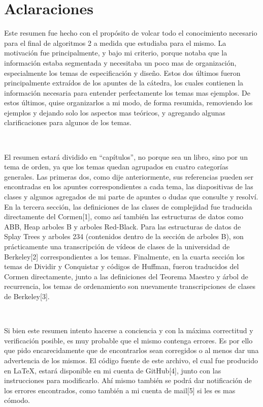 \documentclass[10pt, a4paper]{report}
\begin{document}

\newpage

\chapter*{Aclaraciones}

Este resumen fue hecho con el prop\'osito de volcar todo el conocimiento necesario para el final de algoritmos 2 a medida que estudiaba para el mismo. La motivaci\'on fue principalmente, y bajo mi criterio, porque notaba que la informaci\'on estaba segmentada y necesitaba un poco mas de organizaci\'on, especialmente los temas de especificaci\'on y dise\~no. Estos dos \'ultimos fueron principalmente extra\'idos de los apuntes de la c\'atedra, los cuales contienen la informaci\'on necesaria para entender perfectamente los temas mas ejemplos. De estos \'ultimos, quise organizarlos a mi modo, de forma resumida, removiendo los ejemplos y dejando solo los aspectos mas te\'oricos, y agregando algunas clarificaciones para algunos de los temas.

~

El resumen estar\'a dividido en ``cap\'itulos'', no porque sea un libro, sino por un tema de orden, ya que los temas quedan agrupados en cuatro categor\'ias generales. Las primeras dos, como dije anteriormente, sus referencias pueden ser encontradas en los apuntes correspondientes a cada tema, las diapositivas de las clases y algunos agregados de mi parte de apuntes o dudas que consulte y resolv\'i. En la tercera secci\'on, las definiciones de las clases de complejidad fue traducida directamente del Cormen[1], como as\'i tambi\'en las estructuras de datos como ABB, Heap arboles B y arboles Red-Black. Para las estructuras de datos de Splay Trees y arboles 234 (contenidos dentro de la secci\'on de arboles B), son pr\'acticamente una transcripci\'on de v\'ideos de clases de la universidad de Berkeley[2] correspondientes a los temas. Finalmente, en la cuarta secci\'on los temas de Dividir y Conquistar y c\'odigos de Huffman, fueron traducidos del Cormen directamente, junto a las definiciones del Teorema Maestro y \'arbol de recurrencia, los temas de ordenamiento son nuevamente transcripciones de clases de Berkeley[3].

~

Si bien este resumen intento hacerse a conciencia y con la m\'axima correctitud y verificaci\'on posible, es muy probable que el mismo contenga errores. Es por ello que pido encarecidamente que de encontrarlos sean corregidos o al menos dar una advertencia de los mismos. El c\'odigo fuente de este archivo, el cual fue producido en LaTeX, estar\'a disponible en mi cuenta de GitHub[4], junto con las instrucciones para modificarlo. Ah\'i mismo tambi\'en se podr\'a dar notificaci\'on de los errores encontrados, como tambi\'en a mi cuenta de mail[5] si les es mas c\'omodo.
\end{document}
